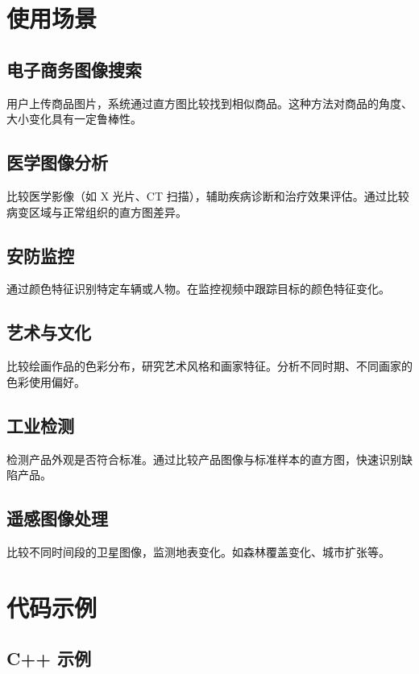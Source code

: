 \documentclass{article}
\begin{document}
\section{使用场景}

\subsection{电子商务图像搜索}
用户上传商品图片，系统通过直方图比较找到相似商品。这种方法对商品的角度、大小变化具有一定鲁棒性。

\subsection{医学图像分析}
比较医学影像（如 X 光片、CT 扫描），辅助疾病诊断和治疗效果评估。通过比较病变区域与正常组织的直方图差异。

\subsection{安防监控}
通过颜色特征识别特定车辆或人物。在监控视频中跟踪目标的颜色特征变化。

\subsection{艺术与文化}
比较绘画作品的色彩分布，研究艺术风格和画家特征。分析不同时期、不同画家的色彩使用偏好。

\subsection{工业检测}
检测产品外观是否符合标准。通过比较产品图像与标准样本的直方图，快速识别缺陷产品。

\subsection{遥感图像处理}
比较不同时间段的卫星图像，监测地表变化。如森林覆盖变化、城市扩张等。

\section{代码示例}

\subsection{C++ 示例}
\end{document}
